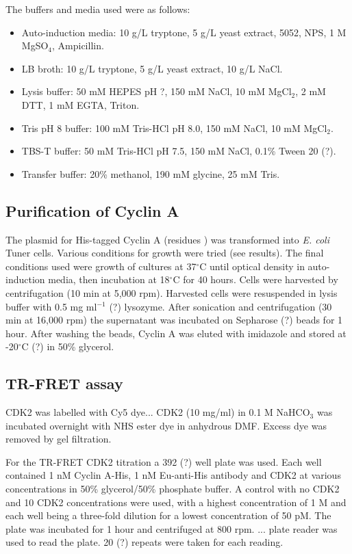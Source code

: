 The buffers and media used were as follows:
\begin{itemize}
\item Auto-induction media: 10 g/L tryptone, 5 g/L yeast extract, 5052, NPS, 1 M MgSO$_{4}$, Ampicillin.
\item LB broth: 10 g/L tryptone, 5 g/L yeast extract, 10 g/L NaCl.
\item Lysis buffer: 50 mM HEPES pH ?, 150 mM NaCl, 10 mM MgCl$_{2}$, 2 mM DTT, 1 mM EGTA, Triton.
\item Tris pH 8 buffer: 100 mM Tris-HCl pH 8.0, 150 mM NaCl, 10 mM MgCl$_{2}$.
\item TBS-T buffer: 50 mM Tris-HCl pH 7.5, 150 mM NaCl, 0.1\% Tween 20 (?).
\item Transfer buffer: 20\% methanol, 190 mM glycine, 25 mM Tris.
\end{itemize}


\subsection{Purification of Cyclin A}

The plasmid for His-tagged Cyclin A (residues ) was transformed into \textit{E. coli} Tuner cells.
Various conditions for growth were tried (see results).
The final conditions used were growth of cultures at 37$^{\circ}$C until optical density in auto-induction media, then incubation at 18$^{\circ}$C for 40 hours.
Cells were harvested by centrifugation (10 min at 5,000 rpm).
Harvested cells were resuspended in lysis buffer with 0.5 mg ml$^{-1}$ (?) lysozyme.
After sonication and centrifugation (30 min at 16,000 rpm) the supernatant was incubated on Sepharose (?) beads for 1 hour.
After washing the beads, Cyclin A was eluted with imidazole and stored at -20$^{\circ}$C (?) in 50\% glycerol.


\subsection{TR-FRET assay}

CDK2 was labelled with Cy5 dye...
CDK2 (10 mg/ml) in 0.1 M NaHCO$_{3}$ was incubated overnight with NHS ester dye in anhydrous DMF.
Excess dye was removed by gel filtration.

For the TR-FRET CDK2 titration a 392 (?) well plate was used.
Each well contained 1 nM Cyclin A-His, 1 nM Eu-anti-His antibody and CDK2 at various concentrations in 50\% glycerol/50\% phosphate buffer.
A control with no CDK2 and 10 CDK2 concentrations were used, with a highest concentration of 1 \textmu M and each well being a three-fold dilution for a lowest concentration of 50 pM.
The plate was incubated for 1 hour and centrifuged at 800 rpm.
... plate reader was used to read the plate.
20 (?) repeats were taken for each reading.


